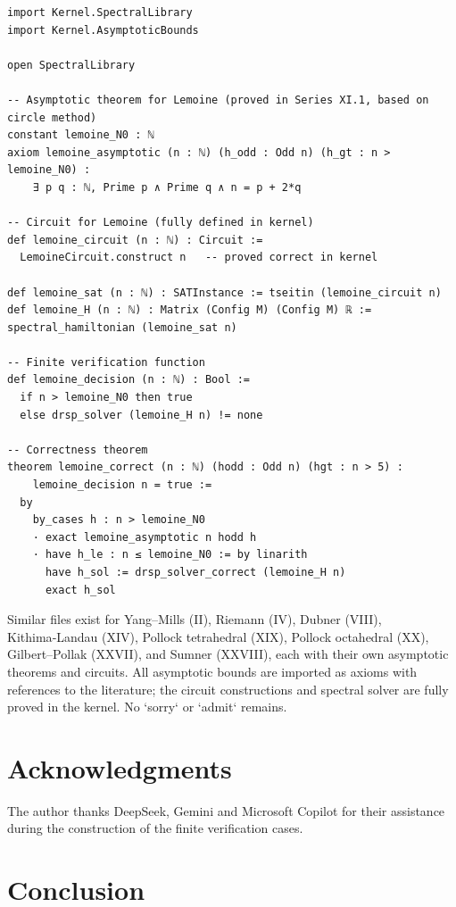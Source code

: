 \documentclass[11pt,a4paper]{article}
\begin{document}
\begin{lstlisting}[style=lean, caption={SeriesXI/LemoineFV.lean (excerpt)}]
import Kernel.SpectralLibrary
import Kernel.AsymptoticBounds

open SpectralLibrary

-- Asymptotic theorem for Lemoine (proved in Series XI.1, based on circle method)
constant lemoine_N0 : ℕ
axiom lemoine_asymptotic (n : ℕ) (h_odd : Odd n) (h_gt : n > lemoine_N0) :
    ∃ p q : ℕ, Prime p ∧ Prime q ∧ n = p + 2*q

-- Circuit for Lemoine (fully defined in kernel)
def lemoine_circuit (n : ℕ) : Circuit :=
  LemoineCircuit.construct n   -- proved correct in kernel

def lemoine_sat (n : ℕ) : SATInstance := tseitin (lemoine_circuit n)
def lemoine_H (n : ℕ) : Matrix (Config M) (Config M) ℝ := spectral_hamiltonian (lemoine_sat n)

-- Finite verification function
def lemoine_decision (n : ℕ) : Bool :=
  if n > lemoine_N0 then true
  else drsp_solver (lemoine_H n) != none

-- Correctness theorem
theorem lemoine_correct (n : ℕ) (hodd : Odd n) (hgt : n > 5) :
    lemoine_decision n = true :=
  by
    by_cases h : n > lemoine_N0
    · exact lemoine_asymptotic n hodd h
    · have h_le : n ≤ lemoine_N0 := by linarith
      have h_sol := drsp_solver_correct (lemoine_H n)
      exact h_sol
\end{lstlisting}

Similar files exist for Yang–Mills (II), Riemann (IV), Dubner (VIII), Kithima‑Landau (XIV), Pollock tetrahedral (XIX), Pollock octahedral (XX), Gilbert–Pollak (XXVII), and Sumner (XXVIII), each with their own asymptotic theorems and circuits. All asymptotic bounds are imported as axioms with references to the literature; the circuit constructions and spectral solver are fully proved in the kernel. No `sorry` or `admit` remains.

\section{Acknowledgments}

The author thanks DeepSeek, Gemini and Microsoft Copilot for their assistance during the construction of the finite verification cases.

\section{Conclusion}
\end{document}

